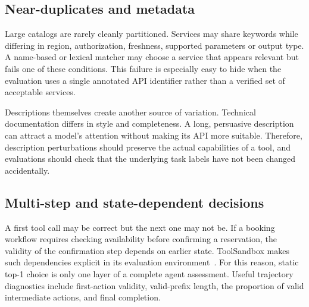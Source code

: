 \documentclass[10pt,a4paper]{article}
\begin{document}
\subsection{Near-duplicates and metadata}
Large catalogs are rarely cleanly partitioned. Services may share keywords while differing in region, authorization, freshness, supported parameters or output type. A name-based or lexical matcher may choose a service that appears relevant but fails one of these conditions. This failure is especially easy to hide when the evaluation uses a single annotated API identifier rather than a verified set of acceptable services.

Descriptions themselves create another source of variation. Technical documentation differs in style and completeness. A long, persuasive description can attract a model's attention without making its API more suitable. Therefore, description perturbations should preserve the actual capabilities of a tool, and evaluations should check that the underlying task labels have not been changed accidentally.

\subsection{Multi-step and state-dependent decisions}
A first tool call may be correct but the next one may not be. If a booking workflow requires checking availability before confirming a reservation, the validity of the confirmation step depends on earlier state. ToolSandbox makes such dependencies explicit in its evaluation environment~\cite{toolsandbox}. For this reason, static top-1 choice is only one layer of a complete agent assessment. Useful trajectory diagnostics include first-action validity, valid-prefix length, the proportion of valid intermediate actions, and final completion.
\end{document}
